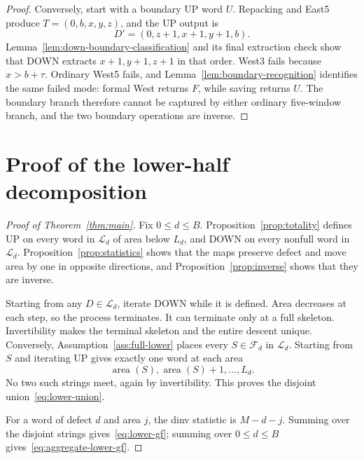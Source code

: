 \documentclass[11pt]{article}
\theoremstyle{definition}
\theoremstyle{remark}
\newcommand{\area}{\operatorname{area}}
\begin{document}
\begin{proof}
Conversely, start with a boundary UP word $U$.  Repacking and East5 produce
$T=(0,b,x,y,z)$, and the UP output is
\[
 D'=(0,z+1,x+1,y+1,b).
\]
Lemma~\ref{lem:down-boundary-classification} and its final extraction check
show that DOWN extracts $x+1,y+1,z+1$ in that order.  West3 fails because
$x>b+\tau$.  Ordinary West5 fails, and
Lemma~\ref{lem:boundary-recognition} identifies the same failed mode: formal
West returns $F$, while saving returns $U$.  The boundary branch therefore
cannot be captured by either ordinary five-window branch, and the two
boundary operations are inverse.
\end{proof}

\section{Proof of the lower-half decomposition}

\begin{proof}[Proof of Theorem~\ref{thm:main}]
Fix $0\le d\le B$.  Proposition~\ref{prop:totality} defines UP on every
word in $\mathcal L_d$ of area below $L_d$, and DOWN on every nonfull word
in $\mathcal L_d$.  Proposition~\ref{prop:statistics} shows that the maps
preserve defect and move area by one in opposite directions, and
Proposition~\ref{prop:inverse} shows that they are inverse.

Starting from any $D\in\mathcal L_d$, iterate DOWN while it is defined.
Area decreases at each step, so the process terminates.  It can terminate
only at a full skeleton.  Invertibility makes the terminal skeleton and the
entire descent unique.  Conversely, Assumption~\ref{ass:full-lower} places
every $S\in\mathcal F_d$ in $\mathcal L_d$.  Starting from $S$ and iterating
UP gives exactly one word at each area
\[
 \area(S),\area(S)+1,\ldots,L_d.
\]
No two such strings meet, again by invertibility.  This proves the disjoint
union~\eqref{eq:lower-union}.

For a word of defect $d$ and area $j$, the dinv statistic is $M-d-j$.
Summing over the disjoint strings gives~\eqref{eq:lower-gf}; summing over $0\le d\le B$ gives~\eqref{eq:aggregate-lower-gf}.
\end{proof}
\end{document}
